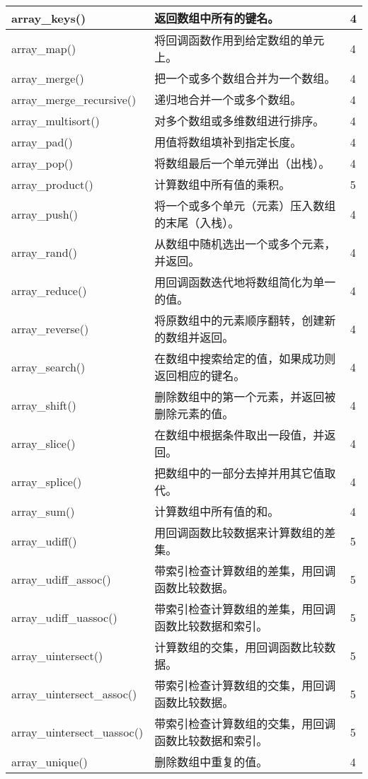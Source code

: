 \begin{longtable}{|m{120pt}|m{250pt}|m{20pt}|}
array\_keys()					&返回数组中所有的键名。	&4\\
\hline
array\_map()					&将回调函数作用到给定数组的单元上。	&4	\\
\hline
array\_merge()					&把一个或多个数组合并为一个数组。	&4\\
\hline
array\_merge\_recursive()		&递归地合并一个或多个数组。	&4\\
\hline
array\_multisort()				&对多个数组或多维数组进行排序。&	4\\
\hline
array\_pad()					&用值将数组填补到指定长度。	&4\\
\hline
array\_pop()					&将数组最后一个单元弹出（出栈）。&	4\\
\hline
array\_product()				&计算数组中所有值的乘积。	&5\\
\hline
array\_push()					&将一个或多个单元（元素）压入数组的末尾（入栈）。	&4\\
\hline
array\_rand()					&从数组中随机选出一个或多个元素，并返回。	&4\\
\hline
array\_reduce()					&用回调函数迭代地将数组简化为单一的值。	&4\\
\hline
array\_reverse()				&将原数组中的元素顺序翻转，创建新的数组并返回。	&4\\
\hline
array\_search()					&在数组中搜索给定的值，如果成功则返回相应的键名。	&4\\
\hline
array\_shift()					&删除数组中的第一个元素，并返回被删除元素的值。	&4\\
\hline
array\_slice()					&在数组中根据条件取出一段值，并返回。	&4\\
\hline
array\_splice()					&把数组中的一部分去掉并用其它值取代。	&4\\
\hline
array\_sum()					&计算数组中所有值的和。	&4\\
\hline
array\_udiff()					&用回调函数比较数据来计算数组的差集。	&5\\
\hline
array\_udiff\_assoc()			&带索引检查计算数组的差集，用回调函数比较数据。	&5\\
\hline
array\_udiff\_uassoc()			&带索引检查计算数组的差集，用回调函数比较数据和索引。	&5\\
\hline
array\_uintersect()				&计算数组的交集，用回调函数比较数据。	&5\\
\hline
array\_uintersect\_assoc()		&带索引检查计算数组的交集，用回调函数比较数据。	&5\\
\hline
array\_uintersect\_uassoc()		&带索引检查计算数组的交集，用回调函数比较数据和索引。	&5\\
\hline
array\_unique()					&删除数组中重复的值。	&4\\

\end{longtable}
